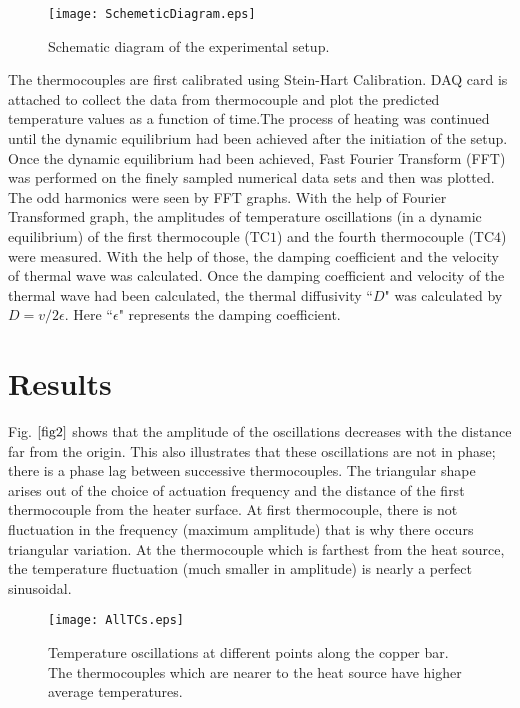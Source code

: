 \documentclass[12pt,a4]{article}
\begin{document}
\begin{figure}[!h]
\begin{center}
\texttt{[image: SchemeticDiagram.eps]}\\
\caption{Schematic diagram of the experimental setup. } \label{fig1}
\end{center}
\end{figure}
The thermocouples are first calibrated using Stein-Hart Calibration. DAQ card is attached to collect the data from thermocouple and plot the predicted temperature values as a function of time.The process of heating was continued until the dynamic equilibrium had been achieved after the initiation of the setup. \\ Once the dynamic equilibrium had been achieved, Fast Fourier Transform (FFT) was performed on the finely sampled numerical data sets and then was plotted. The odd harmonics were seen by FFT graphs.
With the help of Fourier Transformed graph, the amplitudes of temperature oscillations (in a dynamic equilibrium) of the first thermocouple (TC$1$) and the fourth thermocouple (TC$4$) were measured. With the help of those, the damping coefficient and the velocity of thermal wave  was calculated.
Once the damping coefficient and velocity of the thermal wave had been calculated, the thermal diffusivity ``$D$" was calculated by $D=v/2\epsilon$. Here ``$\epsilon$" represents the damping coefficient.


\section{Results}
Fig. $\ref{fig2}$ shows that the amplitude of the oscillations decreases with the distance far from the origin. This also illustrates that these oscillations are not in phase; there is a phase lag between successive thermocouples. The triangular shape arises out of the choice of actuation frequency and the distance of the first thermocouple from the heater surface. At first thermocouple, there is not fluctuation in the frequency (maximum amplitude) that is why there occurs triangular variation. At the thermocouple which is farthest from the heat source, the temperature fluctuation (much smaller in amplitude) is nearly a perfect sinusoidal.
\begin{figure}[!h]
\begin{center}
\texttt{[image: AllTCs.eps]}\\
\caption{Temperature oscillations at different points along the copper bar. The thermocouples which are nearer to the heat source have higher average temperatures. } \label{fig2}
\end{center}
\end{figure}
\end{document}
